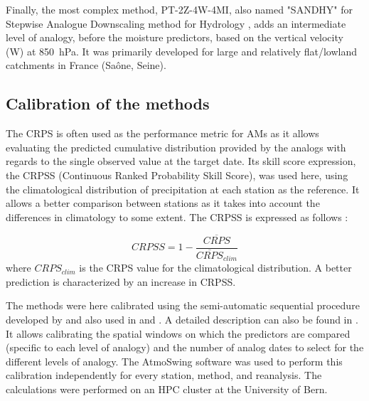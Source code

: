 \documentclass[alpha-refs]{wiley-article}
\begin{document}
Finally, the most complex method, PT-2Z-4W-4MI, also named "SANDHY" for Stepwise Analogue Downscaling method for Hydrology \citep{BenDaoud2016, Caillouet2016}, adds an intermediate level of analogy, before the moisture predictors, based on the vertical velocity (W) at 850~hPa. It was primarily developed for large and relatively flat/lowland catchments in France (Sa\^{o}ne, Seine).


\subsection{Calibration of the methods} %
\label{sec:calibration}

The CRPS \citep[Continuous Ranked Probability Score,][]{Brown1974, Matheson1976, Hersbach2000} is often used as the performance metric for AMs as it allows evaluating the predicted cumulative distribution provided by the analogs with regards to the single observed value at the target date. Its skill score expression, the CRPSS (Continuous Ranked Probability Skill Score), was used here, using the climatological distribution of precipitation at each station as the reference. It allows a better comparison between stations as it takes into account the differences in climatology to some extent. The CRPSS is expressed as follows \citep{Bradley2011}:

\begin{equation}
	\label{eq:CRPSS}
	CRPSS = 1-\frac{\overline{CRPS}}{\overline{CRPS}_{clim}}
\end{equation}
where $CRPS_{clim}$ is the CRPS value for the climatological distribution. A better prediction is characterized by an increase in CRPSS.

The methods were here calibrated using the semi-automatic sequential procedure developed by \citet{Bontron2004} and also used in \citet{Radanovics2013} and \citet{BenDaoud2016}. A detailed description can also be found in \citet{Horton2019}. It allows calibrating the spatial windows on which the predictors are compared (specific to each level of analogy) and the number of analog dates to select for the different levels of analogy. The AtmoSwing software \citep{Horton2019} was used to perform this calibration independently for every station, method, and reanalysis. The calculations were performed on an HPC cluster at the University of Bern. 
\end{document}
